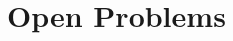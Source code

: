 \section{Open Problems}
\label{sec:open-problems}


\lipsum[46]

\begin{criticalinsight}
\end{criticalinsight}
